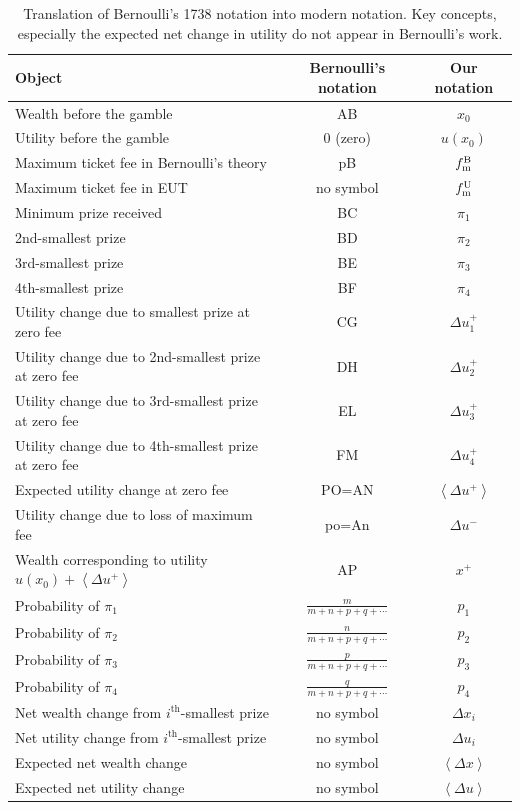\documentclass[pdftex]{article}
\newcommand{\ave}[1]{\left\langle#1 \right\rangle}
\newcommand{\tlabel}[1]{\label{tab:#1}}
\newcommand{\Dx}{{\Delta x}}
\newcommand{\Du}{\Delta u}
\newcommand{\tml}{{f_{\text{\normalfont{m}}}^{\text{\normalfont{U}}}}}
\newcommand{\tmb}{{f_{\text{\normalfont{m}}}^{\text{\normalfont{B}}}}}
\begin{document}
\begin{center}
\begin{table}
  \begin{tabular}{ l | c | c }
    \hline
    Object & Bernoulli's notation & Our notation \\ \hline    
    Wealth before the gamble & AB & $x_0$ \\
    Utility before the gamble & $0$ (zero) & $u(x_0)$\\
    Maximum ticket fee in Bernoulli's theory & pB & $\tmb$ \\
    Maximum ticket fee in EUT & no symbol & $\tml$ \\
    Minimum prize received & BC & $\pi_1$\\
    2nd-smallest prize & BD & $\pi_2$\\
    3rd-smallest prize & BE & $\pi_3$\\
    4th-smallest prize & BF & $\pi_4$\\
Utility change due to smallest prize at zero fee & CG&$\Du^+_1$\\
Utility change due to 2nd-smallest prize at zero fee & DH&$\Du^+_2$\\
Utility change due to 3rd-smallest prize at zero fee & EL&$\Du^+_3$\\
Utility change due to 4th-smallest prize at zero fee & FM&$\Du^+_4$\\
Expected utility change at zero fee & PO=AN&$\ave{\Du^+}$\\
    Utility change due to loss of maximum fee & po=An &$\Du^{-}$\\
    Wealth corresponding to utility $u(x_0)+\ave{\Delta u^+}$ &AP&$x^+$\\
Probability of $\pi_1$ &$\frac{m}{m+n+p+q+\cdots}$&$p_1$\\
Probability of $\pi_2$ &$\frac{n}{m+n+p+q+\cdots}$&$p_2$\\
Probability of $\pi_3$ &$\frac{p}{m+n+p+q+\cdots}$&$p_3$\\
Probability of $\pi_4$ &$\frac{q}{m+n+p+q+\cdots}$&$p_4$\\
Net wealth change from $i^{\text{th}}$-smallest prize & no symbol & $\Dx_i$\\
Net utility change from $i^{\text{th}}$-smallest prize & no symbol & $\Du_i$\\
Expected net wealth change & no symbol & $\ave{\Dx}$\\
Expected net utility change & no symbol & $\ave{\Du}$\\
    \hline
  \end{tabular}
\caption{Translation of Bernoulli's 1738 notation into modern notation. Key concepts, especially the expected net change in utility do not appear in Bernoulli's work.}
    \tlabel{key}
\end{table}
\end{center}
\end{document}
